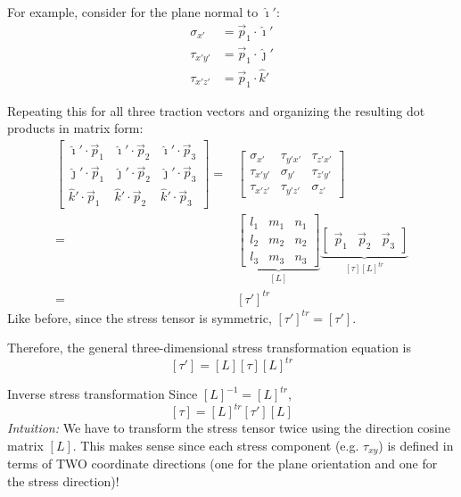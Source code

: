 ﻿\documentclass[12pt]{article}
\begin{document}
For example, consider for the plane normal to \(\hat{\imath}'\):
\[
\begin{aligned}
\sigma_{x'}&=\vec p_1\cdot\hat{\imath}'\\
\tau_{x'y'}&=\vec p_1\cdot\hat{\jmath}'\\
\tau_{x'z'}&=\vec p_1\cdot\hat{k}'
\end{aligned}
\]

Repeating this for all three traction vectors and organizing the resulting dot products in matrix form:
\[\begin{aligned}
    \begin{bmatrix}
\hat{\imath}'\cdot\vec p_1&
\hat{\imath}'\cdot\vec p_2&
\hat{\imath}'\cdot\vec p_3\\
\hat{\jmath}'\cdot\vec p_1&
\hat{\jmath}'\cdot\vec p_2&
\hat{\jmath}'\cdot\vec p_3\\
\hat{k}'\cdot\vec p_1&
\hat{k}'\cdot\vec p_2&
\hat{k}'\cdot\vec p_3
\end{bmatrix}
=& \begin{bmatrix}
\sigma_{x'} & \tau_{y'x'} & \tau_{z'x'}\\
\tau_{x'y'} & \sigma_{y'} & \tau_{z'y'}\\
\tau_{x'z'} & \tau_{y'z'} & \sigma_{z'}
\end{bmatrix}\\
=&
\underbrace{
\begin{bmatrix}
l_1&m_1&n_1\\
l_2&m_2&n_2\\
l_3&m_3&n_3
\end{bmatrix}
}_{[L]}
\underbrace{
\begin{bmatrix}
\vec p_1&\vec p_2&\vec p_3
\end{bmatrix}
}_{[\tau][L]^{tr}}\\
=& [\tau']^{tr}
\end{aligned}
\]
Like before, since the stress tensor is symmetric, \([\tau']^{tr}=[\tau']\).

Therefore, the general three-dimensional stress transformation equation is
\[
\boxed{[\tau']=[L][\tau][L]^{tr}}
\]

Inverse stress transformation
Since \([L]^{-1}=[L]^{tr}\),
\[
\boxed{[\tau]=[L]^{tr}[\tau'][L]}
\]
\textit{Intuition:} We have to transform the stress tensor twice using the direction cosine matrix \([L]\). This makes sense since each stress component (e.g. $\tau_{xy}$) is defined in terms of TWO coordinate directions (one for the plane orientation and one for the stress direction)! 
\end{document}
